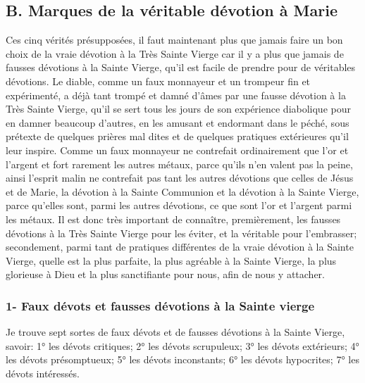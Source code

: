 \subsection{B. Marques de la véritable dévotion à Marie}
 Ces cinq vérités présupposées, il faut maintenant plus que jamais faire un bon choix de la vraie dévotion à la
Très Sainte Vierge car il y a plus que jamais de fausses dévotions à la Sainte Vierge, qu'il est facile de prendre
pour de véritables dévotions. Le diable, comme un faux monnayeur et un trompeur fin et expérimenté, a déjà tant
trompé et damné d'âmes par une fausse dévotion à la Très Sainte Vierge, qu'il se sert tous les jours de son
expérience diabolique pour en damner beaucoup d'autres, en les amusant et endormant dans le péché, sous
prétexte de quelques prières mal dites et de quelques pratiques extérieures qu'il leur inspire. Comme un faux
monnayeur ne contrefait ordinairement que l'or et l'argent et fort rarement les autres métaux, parce qu'ils n'en
valent pas la peine, ainsi l'esprit malin ne contrefait pas tant les autres dévotions que celles de Jésus et de Marie,
la dévotion à la Sainte Communion et la dévotion à la Sainte Vierge, parce qu'elles sont, parmi les autres
dévotions, ce que sont l'or et l'argent parmi les métaux.
 Il est donc très important de connaître, premièrement, les fausses dévotions à la Très Sainte Vierge pour les
éviter, et la véritable pour l'embrasser; secondement, parmi tant de pratiques différentes de la vraie dévotion à la
Sainte Vierge, quelle est la plus parfaite, la plus agréable à la Sainte Vierge, la plus glorieuse à Dieu et la plus
sanctifiante pour nous, afin de nous y attacher.
\subsubsection{1- Faux dévots et fausses dévotions à la Sainte vierge}
 Je trouve sept sortes de faux dévots et de fausses dévotions à la Sainte Vierge, savoir:
1° les dévots critiques;
2° les dévots scrupuleux;
3° les dévots extérieurs;
4° les dévots présomptueux;
5° les dévots inconstants;
6° les dévots hypocrites;
7° les dévots intéressés.

